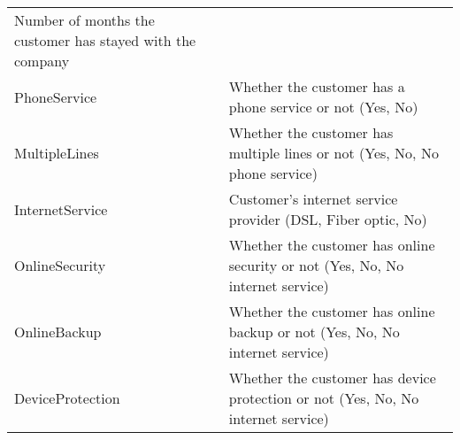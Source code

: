 \documentclass[]{article}
\begin{document}
\begin{longtable}[]{@{}ll@{}}
\begin{minipage}[t]{0.72\columnwidth}
Number of months the customer has stayed with the company\strut
\end{minipage}\tabularnewline
\begin{minipage}[t]{0.22\columnwidth}\raggedright\strut
PhoneService\strut
\end{minipage} & \begin{minipage}[t]{0.72\columnwidth}\raggedright\strut
Whether the customer has a phone service or not (Yes, No)\strut
\end{minipage}\tabularnewline
\begin{minipage}[t]{0.22\columnwidth}\raggedright\strut
MultipleLines\strut
\end{minipage} & \begin{minipage}[t]{0.72\columnwidth}\raggedright\strut
Whether the customer has multiple lines or not (Yes, No, No phone
service)\strut
\end{minipage}\tabularnewline
\begin{minipage}[t]{0.22\columnwidth}\raggedright\strut
InternetService\strut
\end{minipage} & \begin{minipage}[t]{0.72\columnwidth}\raggedright\strut
Customer's internet service provider (DSL, Fiber optic, No)\strut
\end{minipage}\tabularnewline
\begin{minipage}[t]{0.22\columnwidth}\raggedright\strut
OnlineSecurity\strut
\end{minipage} & \begin{minipage}[t]{0.72\columnwidth}\raggedright\strut
Whether the customer has online security or not (Yes, No, No internet
service)\strut
\end{minipage}\tabularnewline
\begin{minipage}[t]{0.22\columnwidth}\raggedright\strut
OnlineBackup\strut
\end{minipage} & \begin{minipage}[t]{0.72\columnwidth}\raggedright\strut
Whether the customer has online backup or not (Yes, No, No internet
service)\strut
\end{minipage}\tabularnewline
\begin{minipage}[t]{0.22\columnwidth}\raggedright\strut
DeviceProtection\strut
\end{minipage} & \begin{minipage}[t]{0.72\columnwidth}\raggedright\strut
Whether the customer has device protection or not (Yes, No, No internet
service)\strut
\end{minipage}\tabularnewline

\end{longtable}
\end{document}
